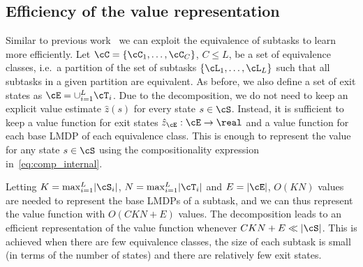 \subsection{Efficiency of the value representation}
 Similar to previous work~\citep{Wen2020,Infante2022} we can exploit the equivalence of subtasks to learn more efficiently. Let $\cC=\{\cC_1,\ldots,\cC_C\}$, $C\leq L$, be a set of equivalence classes, i.e.~a partition of the set of subtasks $\{\cL_1,\ldots,\cL_L\}$ such that all subtasks in a given partition are equivalent.
As before, we also define a set of exit states as $\cE=\cup_{i=1}^L\cT_i$.
Due to the decomposition, we do not need to keep an explicit value estimate $\hat z(s)$ for every state $s\in\cS$. Instead, it is sufficient to keep a value function for exit states $\hat z_\cE: \cE\rightarrow\real$ and a value function for each base LMDP of each equivalence class. This is enough to represent the value for any state $s\in\cS$ using the compositionality expression in~\eqref{eq:comp_internal}.

Letting $K=\max_{i=1} ^L\lvert\cS_i\rvert$,  $N=\max_{i=1} ^L\lvert\cT_i\rvert$ and $E=\lvert\cE\rvert$, $O(KN)$ values are needed to represent the base LMDPs of a subtask, and we can thus represent the value function with $O(CKN + E)$ values. The decomposition leads to an efficient representation of the value function whenever $CKN + E \ll \lvert\cS\rvert$. This is achieved when there are few equivalence classes, the size of each subtask is small (in terms of the number of states) and there are relatively few exit states.


